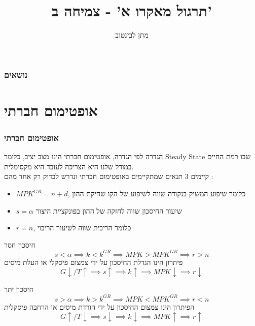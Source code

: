 \documentclass[usenames,dvipsnames,10pt]{beamer}
\title{תרגול מאקרו א' - צמיחה ב'}
\author{{ מתן לבינטוב}}
\institute[{{ אב"ג}}]{{ אוניברסיטת בן גוריון בנגב}}
\date{}
\begin{document}
\begin{RTL}
\begin{frame}
\titlepage
\end{frame}
\begin{frame}
    \frametitle{נושאים}
    \tableofcontents
\end{frame}

\section{אופטימום חברתי}


\begin{frame}[allowframebreaks]
    \frametitle{אופטימום חברתי}
    \begin{block}{הגדרה}
        לפי הגדרה, אופטימום חברתי הינו מצב יציב, כלומר Steady State שבו רמת החיים במודל שלנו היא הצריכה לעובד היא מקסימלית. \\
        קיימים 3 תנאים שמתקיימים באופטימום חברתי ונדרש לבדוק רק אחד מהם :  
        \begin{itemize}
            \item $MPK^{GR} = n + d  $, כלומר שיפוע המשיק בנקודה שווה לשיפוע של הקו שחיקת ההון
            \item $s = \alpha$ שיעור החיסכון שווה לחזקה של ההון בפונקציית היצור
            \item $r = n$, כלומר הריבית שווה לשיעור הריבוי
        \end{itemize}  
    \end{block}

    \framebreak

    \begin{alertblock}{חיסכון חסר}
        $$s < \alpha \implies k < k^{GR} \implies MPK > MPK^{GR} \implies r > n$$
        פיתרון הינו הגדלת החיסכון על ידי צמצום פיסקלי או העלת מיסים 
        $$G \downarrow  / T \uparrow \implies s \uparrow \implies k \uparrow \implies MPK \downarrow \implies r \downarrow$$
    \end{alertblock}

    \begin{exampleblock}{חיסכון יתר}
        $$s > \alpha \implies k > k^{GR} \implies MPK < MPK^{GR} \implies r < n$$   
        הפיתרון הינו צמצום החיסכון על ידי הורדת מיסים או הרחבה פיסקלית
        $$G \uparrow  / T \downarrow \implies s \downarrow \implies k \downarrow \implies MPK \uparrow \implies r \uparrow$$
    \end{exampleblock}
    

\end{frame}


\end{RTL}
\end{document}

